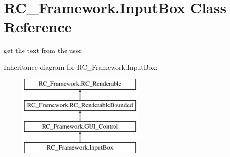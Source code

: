 \hypertarget{class_r_c___framework_1_1_input_box}{}\section{R\+C\+\_\+\+Framework.\+Input\+Box Class Reference}
\label{class_r_c___framework_1_1_input_box}


get the text from the user  


Inheritance diagram for R\+C\+\_\+\+Framework.\+Input\+Box\+:\begin{figure}[H]
\begin{center}
\leavevmode
\includegraphics[height=4.000000cm]{class_r_c___framework_1_1_input_box}
\end{center}
\end{figure}
